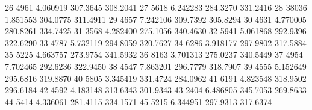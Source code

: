 \documentclass[letterpaper,11pt]{article}
\begin{document}
\begin{Schunk}
\begin{Soutput}
26  4961 4.060919 307.3645 308.2041
27  5618 6.242283 284.3270 331.2416
28 38036 1.851553 304.0775 311.4911
29  4657 7.242106 309.7392 305.8294
30  4631 4.770005 280.8261 334.7425
31  3568 4.282400 275.1056 340.4630
32  5941 5.061868 292.9396 322.6290
33  4787 5.732119 294.8059 320.7627
34  6286 3.918177 297.9802 317.5884
35  5225 4.663757 273.9754 341.5932
36  8163 3.701313 275.0237 340.5449
37  4954 7.702465 292.6236 322.9450
38  4547 7.863201 296.7779 318.7907
39  4555 5.152649 295.6816 319.8870
40  5805 3.345419 331.4724 284.0962
41  6191 4.823548 318.9502 296.6184
42  4592 4.183148 313.6343 301.9343
43  2404 6.486805 345.7053 269.8633
44  5414 4.336061 281.4115 334.1571
45  5215 6.344951 297.9313 317.6374
\end{Soutput}
\end{Schunk}
\end{document}
